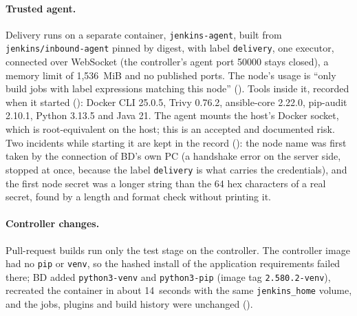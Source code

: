 \paragraph{Trusted agent.} Delivery runs on a separate container, \texttt{jenkins-agent}, built from \texttt{jenkins/inbound-agent} pinned by
digest, with label \texttt{delivery}, one executor, connected over WebSocket (the controller's agent port 50000 stays closed), a memory limit
of 1,536~MiB and no published ports. The node's usage is ``only build jobs with label expressions matching this node'' ().
Tools inside it, recorded when it started (): Docker CLI 25.0.5, Trivy 0.76.2, ansible-core 2.22.0, pip-audit 2.10.1, Python 3.13.5 and Java 21.
The agent mounts the host's Docker socket, which is root-equivalent on the host; this is an accepted and documented risk. Two incidents while starting
it are kept in the record (): the node name was first taken by the connection of BD's own PC (a handshake error on the server side, stopped at once, because the label \texttt{delivery}
is what carries the credentials), and the first node secret was a longer string than the 64 hex characters of a real secret, found by a length and format check without printing it.

\paragraph{Controller changes.} Pull-request builds run only the test stage on the controller. The controller image had no \texttt{pip} or \texttt{venv}, so the hashed install of the
application requirements failed there; BD added \texttt{python3-venv} and \texttt{python3-pip} (image tag \texttt{2.580.2-venv}), recreated the container in about 14~seconds with the
same \texttt{jenkins\_home} volume, and the jobs, plugins and build history were unchanged ().

